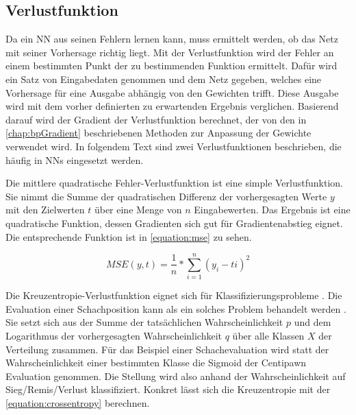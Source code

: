 


\subsection{Verlustfunktion}

Da ein \ac{NN} aus seinen Fehlern lernen kann, muss ermittelt werden, ob das Netz mit seiner Vorhersage richtig liegt. Mit der Verlustfunktion wird der Fehler an einem bestimmten Punkt der zu bestimmenden Funktion ermittelt. Dafür wird ein Satz von Eingabedaten genommen und dem Netz gegeben, welches eine Vorhersage für eine Ausgabe abhängig von den Gewichten trifft. Diese Ausgabe wird mit dem vorher definierten zu erwartenden Ergebnis verglichen. Basierend darauf wird der Gradient der Verlustfunktion berechnet, der von den in \autoref{chap:bpGradient} beschriebenen Methoden zur Anpassung der Gewichte verwendet wird. In folgendem Text sind zwei Verlustfunktionen beschrieben, die häufig in \acp{NN} eingesetzt werden.

Die mittlere quadratische Fehler-Verlustfunktion ist eine simple Verlustfunktion. Sie nimmt die Summe der quadratischen Differenz der vorhergesagten Werte $y$ mit den Zielwerten $t$ über eine Menge von $n$ Eingabewerten. Das Ergebnis ist eine quadratische Funktion, dessen Gradienten sich gut für Gradientenabstieg eignet. Die entsprechende Funktion ist in \autoref{equation:mse} zu sehen.

\begin{equation}
  MSE(y, t)=\frac{1}{n}*\sum^{n}_{i=1}(y_{i}-t{i})^{2}
  \label{equation:mse}
\end{equation}

Die Kreuzentropie-Verlustfunktion eignet sich für Klassifizierungsprobleme \cite{Kline2005}. Die Evaluation einer Schachposition kann als ein solches Problem behandelt werden \cite{StockfishNNUE}. Sie setzt sich aus der Summe der tatsächlichen Wahrscheinlichkeit $p$ und dem Logarithmus der vorhergesagten Wahrscheinlichkeit $q$ über alle Klassen $X$ der Verteilung zusammen. Für das Beispiel einer Schachevaluation wird statt der Wahrscheinlichkeit einer bestimmten Klasse die Sigmoid der Centipawn Evaluation genommen. Die Stellung wird also anhand der Wahrscheinlichkeit auf Sieg/Remis/Verlust klassifiziert. Konkret lässt sich die Kreuzentropie mit der \autoref{equation:crossentropy} berechnen.

